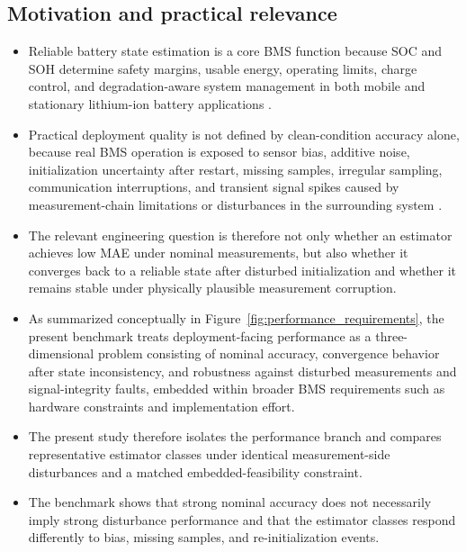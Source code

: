 \documentclass[review,nopreprintline]{elsarticle}
\begin{document}
\subsection{Motivation and practical relevance}
\begin{itemize}[leftmargin=*]
    \item Reliable battery state estimation is a core BMS function because SOC and SOH determine safety margins, usable energy, operating limits, charge control, and degradation-aware system management in both mobile and stationary lithium-ion battery applications \cite{shrivastavaReviewTechnologicalAdvancement2023,guoSystematicReviewElectrochemical2024,yaoSmarterBatteryManagement2025b}.
    \item Practical deployment quality is not defined by clean-condition accuracy alone, because real BMS operation is exposed to sensor bias, additive noise, initialization uncertainty after restart, missing samples, irregular sampling, communication interruptions, and transient signal spikes caused by measurement-chain limitations or disturbances in the surrounding system \cite{liRobustnessSOCEstimation2015,naseriReliableWirelessBMS2025,bergerBenchmarkingBatteryManagement2024}.
    \item The relevant engineering question is therefore not only whether an estimator achieves low MAE under nominal measurements, but also whether it converges back to a reliable state after disturbed initialization and whether it remains stable under physically plausible measurement corruption.
    \item As summarized conceptually in Figure~\ref{fig:performance_requirements}, the present benchmark treats deployment-facing performance as a three-dimensional problem consisting of nominal accuracy, convergence behavior after state inconsistency, and robustness against disturbed measurements and signal-integrity faults, embedded within broader BMS requirements such as hardware constraints and implementation effort.
    \item The present study therefore isolates the performance branch and compares representative estimator classes under identical measurement-side disturbances and a matched embedded-feasibility constraint.
    \item The benchmark shows that strong nominal accuracy does not necessarily imply strong disturbance performance and that the estimator classes respond differently to bias, missing samples, and re-initialization events.
\end{itemize}
\end{document}
